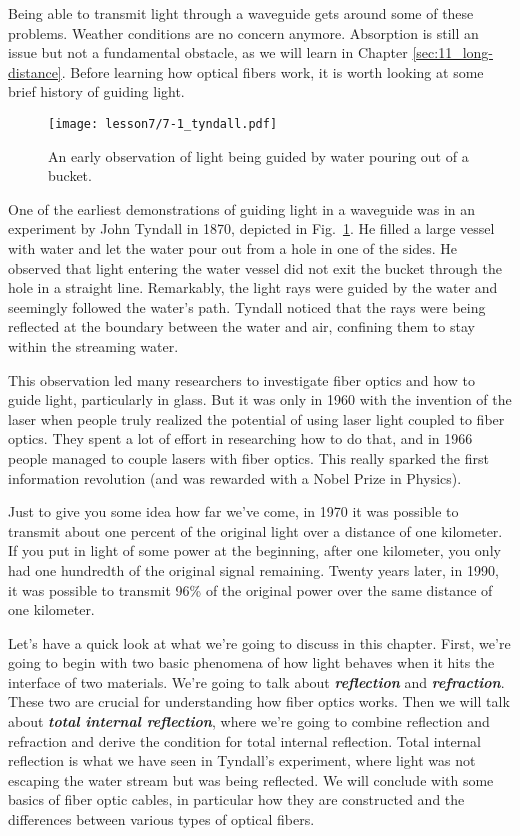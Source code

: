 Being able to transmit light through a waveguide gets around some of these problems.
Weather conditions are no concern anymore.
Absorption is still an issue but not a fundamental obstacle, as we will learn in Chapter \ref{sec:11_long-distance}.
Before learning how optical fibers work, it is worth looking at some brief history of guiding light.

\begin{figure}[t]
    \centering
    \texttt{[image: lesson7/7-1\_tyndall.pdf]}
    \caption[Tyndall's experiment.]{An early observation of light being guided by water pouring out of a bucket.}
    \label{fig:7-1_tyndall}
\end{figure}

One of the earliest demonstrations of guiding light in a waveguide was in an experiment by John Tyndall in 1870, depicted in Fig.~\ref{fig:7-1_tyndall}.
He filled a large vessel with water and let the water pour out from a hole in one of the sides.
He observed that light entering the water vessel did not exit the bucket through the hole in a straight line.
Remarkably, the light rays were guided by the water and seemingly followed the water's path.
Tyndall noticed that the rays were being reflected at the boundary between the water and air, confining them to stay within the streaming water.

This observation led many researchers to investigate fiber optics and how to guide light, particularly in glass.
But it was only in 1960 with the invention of the laser when people truly realized the potential of using laser light coupled to fiber optics.
They spent a lot of effort in researching how to do that, and in 1966 people managed to couple lasers with fiber optics.
This really sparked the first information revolution (and was rewarded with a Nobel Prize in Physics).

Just to give you some idea how far we've come, in 1970 it was possible to transmit about one percent of the original light over a distance of one kilometer.
If you put in light of some power at the beginning, after one kilometer, you only had one hundredth of the original signal remaining.
Twenty years later, in 1990, it was possible to transmit 96\% of the original power over the same distance of one kilometer.

Let's have a quick look at what we're going to discuss in this chapter.
First, we're going to begin with two basic phenomena of how light behaves when it hits the interface of two materials.
We're going to talk about \textbf{\emph{reflection}} and \textbf{\emph{refraction}}.
These two are crucial for understanding how fiber optics works.
Then we will talk about \textbf{\emph{total internal reflection}}, where we're going to combine reflection and refraction and derive the condition for total internal reflection.
Total internal reflection is what we have seen in Tyndall's experiment, where light was not escaping the water stream but was being reflected.
We will conclude with some basics of fiber optic cables, in particular how they are constructed and the differences between various types of optical fibers.


